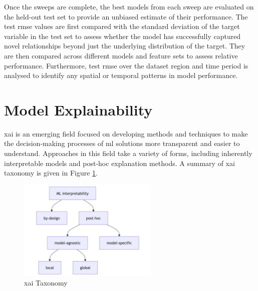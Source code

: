 Once the sweeps are complete, the best models from each sweep are evaluated on the held-out test set to provide an unbiased estimate of their performance. The test \acrshort{rmse} values are first compared with the standard deviation of the target variable in the test set to assess whether the model has successfully captured novel relationships beyond just the underlying distribution of the target. They are then compared across different models and feature sets to assess relative performance. Furthermore, test \acrshort{rmse} over the dataset region and time period is analysed to identify any spatial or temporal patterns in model performance.

\section{Model Explainability}

\acrfull{xai} is an emerging field focused on developing methods and techniques to make the decision-making processes of \acrshort{ml} solutions more transparent and easier to understand. Approaches in this field take a variety of forms, including inherently interpretable models and post-hoc explanation methods. A summary of \acrshort{xai} taxonomy is given in Figure \ref{fig:xai-taxonomy}.

\begin{figure}[ht]
    \centering
    \includegraphics[width=0.6\textwidth]{../figures/static/xai-taxonomy.jpg}
    \caption{\acrshort{xai} Taxonomy \citep{Molnar2025}}
    \label{fig:xai-taxonomy}
\end{figure}

